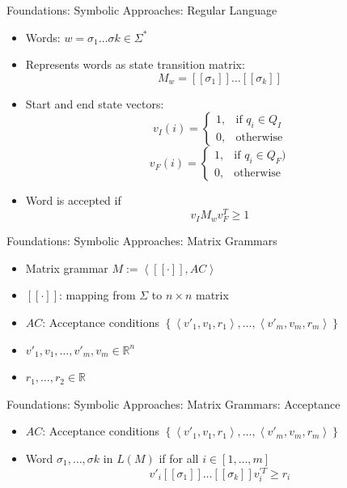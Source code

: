 \documentclass[12pt,a4paper]{beamer}
\newcommand{\tuple}[1]{\ensuremath{\left \langle #1 \right \rangle }}
\newcommand{\setof}[1]{\ensuremath{\left \{ #1 \right \}}}
\begin{document}
\begin{frame}{Foundations: Symbolic Approaches: Regular Language}
\begin{itemize}
\item Words: $w = \sigma_{1} \ldots \sigma{k} \in \Sigma^{*}$ 
\item Represents words as state transition matrix:
$$ M_{w} = [[\sigma_{1}]]\ldots [[\sigma_{k}]]  $$
\item Start and end state vectors:
$$ v_{I}(i) = \left\{\begin{array}{cl} 1, & \mbox{if } q_{i} \in Q_{I} \\ 0, & \mbox{otherwise} \end{array}\right. $$ 
$$ v_{F}(i) = \left\{\begin{array}{cl} 1, & \mbox{if } q_{i} \in Q_{F}) \\ 0, & \mbox{otherwise} \end{array}\right. $$
\item Word is accepted if
$$ v_{I}M_{w}v_{F}^{T} \ge 1 $$
\end{itemize}
\end{frame}



\begin{frame}{Foundations: Symbolic Approaches: Matrix Grammars}
\begin{itemize}
\item Matrix grammar $M := \tuple{[[\mathord{\cdot}]], AC}$
\item $[[\mathord{\cdot}]]$: mapping from $\Sigma$ to $n \times n $ matrix
\item $AC$: Acceptance conditions $ \setof{ \tuple{v'_{1}, v_{1}, r_{1}}, \ldots, \tuple{v'_{m}, v_{m}, r_{m}} }$
\item $v'_{1}, v_{1},\ldots,v'_{m}, v_{m} \in \mathbb{R}^{n}$
\item $r_{1}, \ldots, r_{2} \in \mathbb{R}$
\end{itemize}
\end{frame}

\begin{frame}{Foundations: Symbolic Approaches: Matrix Grammars: Acceptance}
\begin{itemize}
\item $AC$: Acceptance conditions $ \setof{ \tuple{v'_{1}, v_{1}, r_{1}}, \ldots, \tuple{v'_{m}, v_{m}, r_{m}} }$
\item Word $\sigma_{1},\ldots,\sigma{k}$ in $L(M)$ if for all $i \in [1,\ldots,m]$ 
$$v'_{i}[[\sigma_{1}]] \ldots [[\sigma_{k}]] v_{i}^{'T} \ge r_{i}$$
\end{itemize}
\end{frame}
\end{document}
